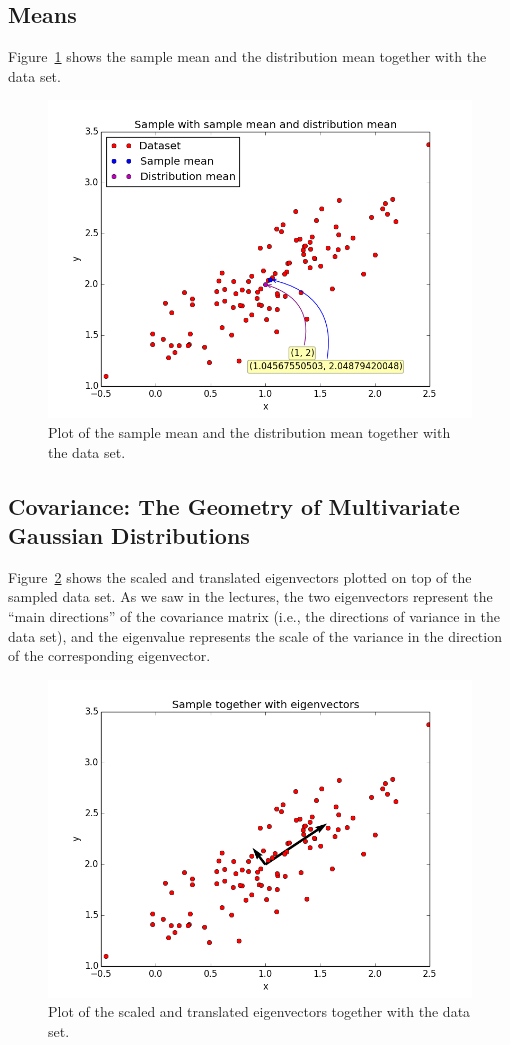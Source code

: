 \documentclass[a4paper]{article}
\begin{document}
\subsection{Means}
Figure~\ref{fig:samples_with_mean} shows the sample mean and the distribution mean together with the data set.

\begin{figure}[H]
  \centering
  \includegraphics[width=.7\linewidth]{figures/samples_with_mean.png}
  \caption{Plot of the sample mean and the distribution mean together with the data set.}
  \label{fig:samples_with_mean}
\end{figure}

\subsection{Covariance: The Geometry of Multivariate Gaussian Distributions}
Figure~\ref{fig:samples_with_eigenvectors} shows the scaled and translated eigenvectors plotted on top of the sampled data set. As we saw in the lectures, the two eigenvectors represent the ``main directions'' of the covariance matrix (i.e., the directions of variance in the data set), and the eigenvalue represents the scale of the variance in the direction of the corresponding eigenvector.

\begin{figure}[H]
  \centering
  \includegraphics[width=.7\linewidth]{figures/samples_with_eigenvectors.png}
  \caption{Plot of the scaled and translated eigenvectors together with the data set.}
  \label{fig:samples_with_eigenvectors}
\end{figure}
\end{document}
